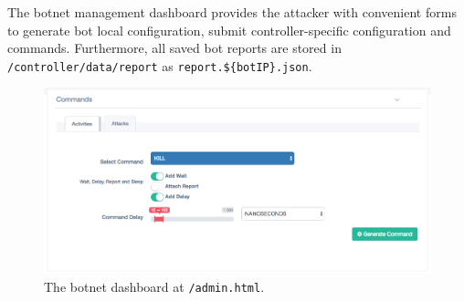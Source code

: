 The botnet management dashboard provides the attacker with convenient forms to generate bot local configuration, submit controller-specific configuration and commands. 
Furthermore, all saved bot reports are stored in \texttt{/controller/data/report} as \texttt{report.\$\{botIP\}.json}.

\begin{figure}[tp]
  \centering
  \includegraphics[scale=0.2]{./fig/commandsWUI.png}
  \caption{The botnet dashboard at \texttt{/admin.html}.}
    \label{fig:controller-botnet-dashboard}
\end{figure}


